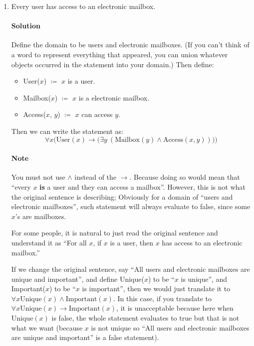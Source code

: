 \documentclass[10pt]{article}
\newcommand{\mapto}{\rightarrow}
\begin{document}
\begin{enumerate}[label=(\alph*)]
\item Every user has access to an electronic mailbox.
  \paragraph{Solution} Define the domain to be users and electronic mailboxes. (If you can't think of a word to represent everything that appeared, you can union whatever objects occurred in the statement into your domain.) Then define:
  \begin{itemize}
  \item User($x$) $\coloneqq$ $x$ is a user.
  \item Mailbox($x$) $\coloneqq$ $x$ is a electronic mailbox.
  \item Access($x$, $y$) $\coloneqq$ $x$ can access $y$.
  \end{itemize}
  Then we can write the statement as:
  \begin{equation}
    \forall x \Bigg(\text{User}(x)\mapto\Big(\exists y\ (\text{Mailbox}(y)\land\text{Access}(x,y))\Big)\Bigg)
  \end{equation}
  \paragraph{Note} You must not use $\land$ instead of the $\mapto$. Because doing so would mean that ``every $x$ \textbf{is} a user and they can access a mailbox''. However, this is not what the original sentence is describing; Obviously for a domain of ``users and electronic mailboxes'', such statement will always evaluate to false, since some $x$'s are mailboxes.

  \qquad For some people, it is natural to just read the original sentence and understand it as ``For all $x$, if $x$ is a user, then $x$ has access to an electronic mailbox.''


\qquad If we change the original sentence, say ``All users and electronic mailboxes are unique and important'', and define Unique($x$) to be ``$x$ is unique'', and Important($x$) to be ``$x$ is important'', then we would just translate it to $\forall x \text{Unique}(x)\land\text{Important}(x)$. In this case, if you translate to $\forall x \text{Unique}(x)\mapto\text{Important}(x)$, it is unacceptable because here when $\text{Unique}(x)$ is false, the whole statement evaluates to true but that is not what we want (because $x$ is not unique so ``All users and electronic mailboxes are unique and important'' is a false statement).


\end{enumerate}
\end{document}
